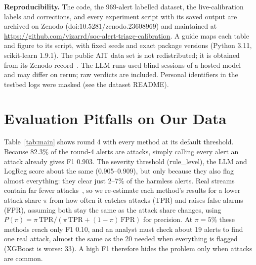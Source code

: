 \documentclass[conference]{IEEEtran}
\begin{document}
\textbf{Reproducibility.} The code, the 969-alert labelled dataset, the live-calibration labels and corrections,
and every experiment script with its saved output are archived on Zenodo (doi:10.5281/zenodo.23608969) and
maintained at \url{https://github.com/vizarrd/soc-alert-triage-calibration}. A guide maps each table and figure to its
script, with fixed seeds and exact package versions (Python 3.11, scikit-learn 1.9.1). The public AIT data set is not
redistributed; it is obtained from its Zenodo record~\cite{ait2023}. The LLM runs used blind sessions of a hosted model
and may differ on rerun; raw verdicts are included. Personal identifiers in the testbed logs were masked (see the
dataset README).

\section{Evaluation Pitfalls on Our Data}

Table~\ref{tab:main} shows round 4 with every method at its default threshold. Because 82.3\%
of the round-4 alerts are attacks, simply calling every alert an attack already gives F1 0.903.
The severity threshold (rule\_level), the LLM and LogReg score about the same
(0.905--0.909), but only because they also flag almost everything: they clear just 2--7\% of the
harmless alerts. Real streams contain far fewer attacks~\cite{axelsson2000}, so we re-estimate each method's results
for a lower attack share $\pi$ from how often it catches attacks (TPR) and raises
false alarms (FPR), assuming both stay the same as the attack share changes, using $P(\pi)=\pi\,\mathrm{TPR}/(\pi\,\mathrm{TPR}+(1-\pi)\,\mathrm{FPR})$
for precision. At $\pi=5\%$ these methods reach only F1 0.10, and an analyst must check about 19
alerts to find one real attack, almost the same as the 20 needed when everything is flagged
(XGBoost is worse: 33). A high F1 therefore hides the problem only when attacks are common.
\end{document}
